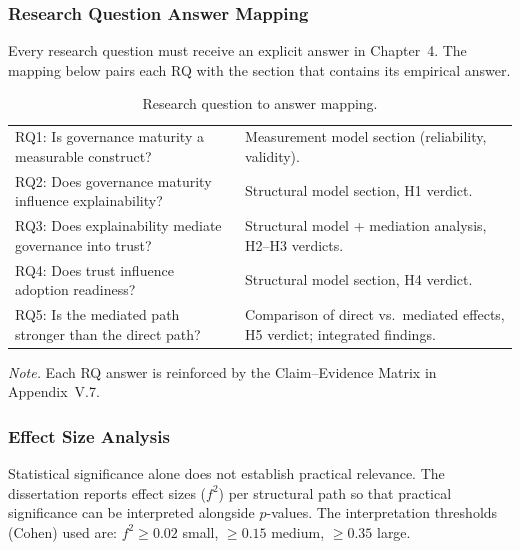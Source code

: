 \subsubsection{Research Question Answer Mapping}
\label{sec:ch4_rq_mapping}

\noindent Every research question must receive an explicit answer in Chapter~4. The mapping below pairs each RQ with the section that contains its empirical answer.

{\tablestripes\tablefontsize
{}
\begin{xltabular}{\textwidth}{@{} >{\raggedright\arraybackslash}p{5cm} L @{}}
\caption[Research question to answer mapping]{Research question to answer mapping.}\label{tab:ch4_rq_mapping} \\
\toprule
{} &  \\
\midrule
\endfirsthead
\endhead
\bottomrule
\endlastfoot
RQ1: Is governance maturity a measurable construct? & Measurement model section (reliability, validity). \\
\addlinespace
RQ2: Does governance maturity influence explainability? & Structural model section, H1 verdict. \\
\addlinespace
RQ3: Does explainability mediate governance into trust? & Structural model + mediation analysis, H2--H3 verdicts. \\
\addlinespace
RQ4: Does trust influence adoption readiness? & Structural model section, H4 verdict. \\
\addlinespace
RQ5: Is the mediated path stronger than the direct path? & Comparison of direct vs.\ mediated effects, H5 verdict; integrated findings. \\
\end{xltabular}}

\vspace{0.3em}\noindent\textit{Note.} Each RQ answer is reinforced by the Claim--Evidence Matrix in Appendix~V.7.


\subsubsection{Effect Size Analysis}
\label{sec:ch4_effect_size}

\noindent Statistical significance alone does not establish practical relevance. The dissertation reports effect sizes ($f^2$) per structural path so that practical significance can be interpreted alongside $p$-values. The interpretation thresholds (Cohen) used are: $f^2 \geq 0.02$ small, $\geq 0.15$ medium, $\geq 0.35$ large.

